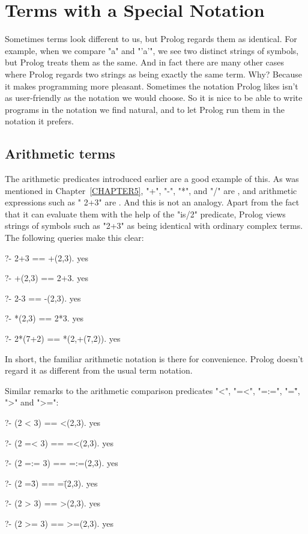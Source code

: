 \section{Terms with a Special Notation}\label{SEC.L9.SPECIAL.NOTATION}



Sometimes terms look different to us, but Prolog regards them as
identical.  For example, when we compare "a" and "'a'", we see two
distinct strings of symbols, but Prolog treats them as the same.  And
in fact there are many other cases where Prolog regards two strings as
being exactly the same term.  Why?  Because it makes programming more
pleasant.  Sometimes the notation Prolog likes isn't as user-friendly
as the notation we would choose.  So it is nice to be able to write
programs in the notation we find natural, and to let Prolog run them
in the notation it prefers.

\subsection*{Arithmetic terms}\label{SUBSEC.L9.ARITHMETIC.TERMS}



The arithmetic predicates introduced earlier are a good example of
this.  As was mentioned in Chapter~\ref{CHAPTER5}, "+", "-", "*", and
"/" are , and arithmetic expressions such as " 2+3"
are .  And this is not an analogy.  Apart from the fact
that it can evaluate them with the help of the "is/2" predicate,
Prolog views strings of symbols such as "2+3" as being identical with
ordinary complex terms. The following queries make this clear:
\begin{LPNcodedisplay}
?- 2+3 == +(2,3).
yes

?- +(2,3) == 2+3.
yes

?- 2-3 == -(2,3).
yes

?- *(2,3) == 2*3.
yes

?- 2*(7+2) == *(2,+(7,2)).
yes
\end{LPNcodedisplay}
In short, the familiar arithmetic notation is there for 
convenience.  Prolog doesn't regard it as different from the usual
term notation.

Similar remarks to the arithmetic comparison predicates "<", "=<", "=:=", "=\=", ">" and ">=":
\begin{LPNcodedisplay}
?- (2 < 3) == <(2,3).
yes

?- (2 =< 3) == =<(2,3).
yes

?- (2 =:= 3) == =:=(2,3).
yes

?- (2 =\= 3) == =\=(2,3).
yes

?- (2 > 3) == >(2,3).
yes

?- (2 >= 3) == >=(2,3).
yes
\end{LPNcodedisplay}

